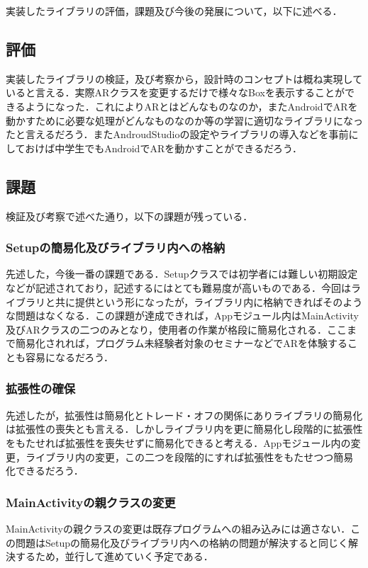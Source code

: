 実装したライブラリの評価，課題及び今後の発展について，以下に述べる．
\vspace{5pt}
\subsection{評価}
実装したライブラリの検証，及び考察から，設計時のコンセプトは概ね実現していると言える．実際ARクラスを変更するだけで様々なBoxを表示することができるようになった．これによりARとはどんなものなのか，またAndroidでARを動かすために必要な処理がどんなものなのか等の学習に適切なライブラリになったと言えるだろう．またAndroudStudioの設定やライブラリの導入などを事前にしておけば中学生でもAndroidでARを動かすことができるだろう．

\vspace{5pt}
\subsection{課題}
検証及び考察で述べた通り，以下の課題が残っている．

\vspace{5pt}
\subsubsection{Setupの簡易化及びライブラリ内への格納}
先述した，今後一番の課題である．Setupクラスでは初学者には難しい初期設定などが記述されており，記述するにはとても難易度が高いものである．今回はライブラリと共に提供という形になったが，ライブラリ内に格納できればそのような問題はなくなる．この課題が達成できれば，Appモジュール内はMainActivity及びARクラスの二つのみとなり，使用者の作業が格段に簡易化される．ここまで簡易化されれば，プログラム未経験者対象のセミナーなどでARを体験することも容易になるだろう．

\vspace{5pt}
\subsubsection{拡張性の確保}
先述したが，拡張性は簡易化とトレード・オフの関係にありライブラリの簡易化は拡張性の喪失とも言える．しかしライブラリ内を更に簡易化し段階的に拡張性をもたせれば拡張性を喪失せずに簡易化できると考える．Appモジュール内の変更，ライブラリ内の変更，この二つを段階的にすれば拡張性をもたせつつ簡易化できるだろう．

\newpage
\subsubsection{MainActivityの親クラスの変更}
MainActivityの親クラスの変更は既存プログラムへの組み込みには適さない．この問題はSetupの簡易化及びライブラリ内への格納の問題が解決すると同じく解決するため，並行して進めていく予定である．

